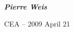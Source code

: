 \documentclass[landscape]{slides}
\begin{document}

\vspace*{2cm}

\begin{center}

{\large \bf \em Pierre Weis}

\vspace*{3cm}

CEA -- 2009 April 21

\end{center}




\end{document}

